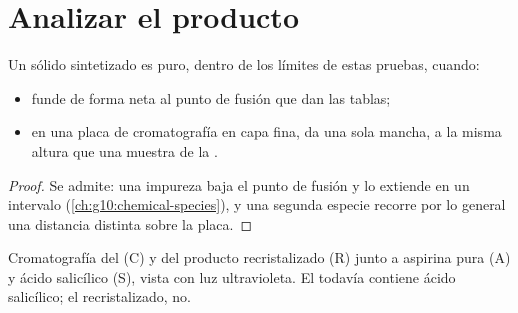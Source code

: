 \section{Analizar el producto}

\begin{proposition}\label{prop:g10:synthesis-yield:checks}
Un sólido sintetizado es puro, dentro de los límites de estas pruebas,
cuando:
\begin{itemize}
  \item funde de forma neta al punto de fusión que dan las tablas;
  \item en una placa de cromatografía en capa fina, da una sola mancha,
        a la misma altura que una muestra de la .
\end{itemize}
\end{proposition}

\begin{proof}
Se admite: una impureza baja el punto de fusión y lo extiende en un
intervalo (\cref{ch:g10:chemical-species}), y una segunda especie
recorre por lo general una distancia distinta sobre la placa.
\end{proof}

\begin{omfigure}

{\small Cromatografía del  (C) y del producto
recristalizado (R) junto a aspirina pura (A) y ácido salicílico (S),
vista con luz ultravioleta. El  todavía contiene ácido
salicílico; el recristalizado, no.}
\end{omfigure}


